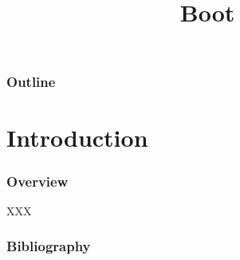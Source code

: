 %
%
%
%
%
%

%
%

%
%

\def\path{../../../..}

%
%



%
%

\title{Boot}

%
%



%
%

\begin{frame}
  \titlepage
\end{frame}

%
%

\begin{frame}
  \frametitle{Outline}

  \tableofcontents
\end{frame}

%
%

\section{Introduction}


\begin{frame}
  \frametitle{Overview}

  XXX\cite{TANENBAUM:DOS'95}
\end{frame}

%
%

\begin{frame}[allowframebreaks]
  \frametitle{Bibliography}

  
  
\end{frame}


